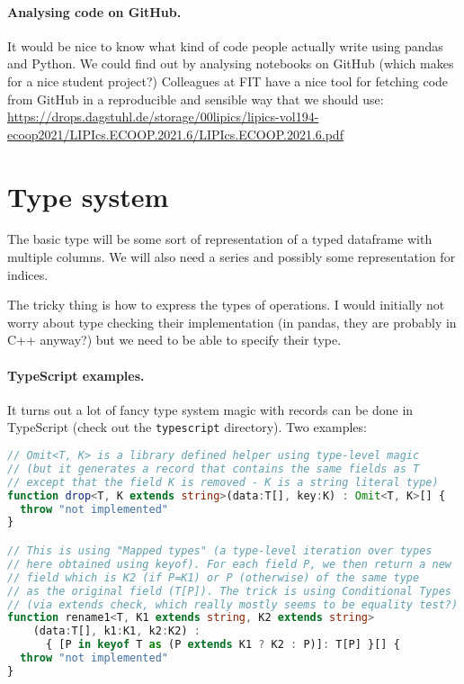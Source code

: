 \documentclass{article}
\begin{document}
\paragraph{Analysing code on GitHub.}
It would be nice to know what kind of code people actually write using pandas and Python. We could find out by analysing notebooks on GitHub (which makes for a nice student project?) Colleagues at FIT have a nice tool for fetching code from GitHub in a reproducible and sensible way that we should use: \url{https://drops.dagstuhl.de/storage/00lipics/lipics-vol194-ecoop2021/LIPIcs.ECOOP.2021.6/LIPIcs.ECOOP.2021.6.pdf}

\section{Type system}
The basic type will be some sort of representation of a typed dataframe with multiple columns. We will also need a series and possibly some representation for indices.

The tricky thing is how to express the types of operations. I would initially not worry about type checking their implementation (in pandas, they are probably in C++ anyway?) but we need to be able to specify their type.

\paragraph{TypeScript examples.}
It turns out a lot of fancy type system magic with records can be done in TypeScript (check out the \texttt{typescript} directory). Two examples:

\begin{lstlisting}[language=TypeScript]
// Omit<T, K> is a library defined helper using type-level magic
// (but it generates a record that contains the same fields as T
// except that the field K is removed - K is a string literal type)
function drop<T, K extends string>(data:T[], key:K) : Omit<T, K>[] {
  throw "not implemented"
}

// This is using "Mapped types" (a type-level iteration over types
// here obtained using keyof). For each field P, we then return a new
// field which is K2 (if P=K1) or P (otherwise) of the same type
// as the original field (T[P]). The trick is using Conditional Types
// (via extends check, which really mostly seems to be equality test?)
function rename1<T, K1 extends string, K2 extends string>
    (data:T[], k1:K1, k2:K2) :
      { [P in keyof T as (P extends K1 ? K2 : P)]: T[P] }[] {
  throw "not implemented"
}
\end{lstlisting}
\end{document}
